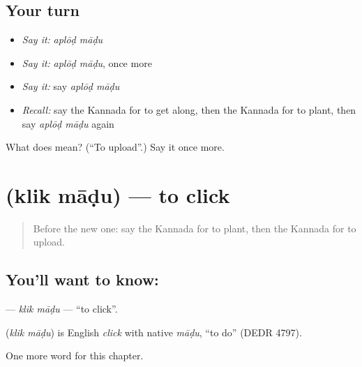\subsection*{Your turn}
\begin{itemize}
\raggedright
  \item \emph{Say it:} \emph{aplōḍ māḍu}
  \item \emph{Say it:} \emph{aplōḍ māḍu}, once more
  \item \emph{Say it:} say \emph{aplōḍ māḍu}
  \item \emph{Recall:} say the Kannada for to get along, then the Kannada for to plant, then say \emph{aplōḍ māḍu} again
\end{itemize}

\begin{tcolorbox}[breakable,colback=teal!4,colframe=teal!35!black,title={Before you move on}]
What does   mean? (\textquotedblleft{}To upload\textquotedblright{}.) Say it once more.
\end{tcolorbox}
\section[\texorpdfstring{\kn{ಕ್ಲಿಕ್} \kn{ಮಾಡು} (klik māḍu)}{ಕ್ಲಿಕ್ ಮಾಡು (klik māḍu)}]{  (klik māḍu) — to click}

\label{lesson:KA-C164-klik-madu}



\begin{quote}
Before the new one: say the Kannada for to plant, then the Kannada for to upload.
\end{quote}

\subsection*{You'll want to know:  }
\textbf{ } — \emph{klik māḍu} — \textquotedblleft{}to click\textquotedblright{}.

\begin{cousinweb}
\textbf{ } (\emph{klik māḍu}) is English \emph{click} with native \emph{māḍu}, \textquotedblleft{}to do\textquotedblright{} (DEDR 4797).
\end{cousinweb}

\begin{grammarlens}[title={What you've built}]
One more word for this chapter.
\end{grammarlens}

